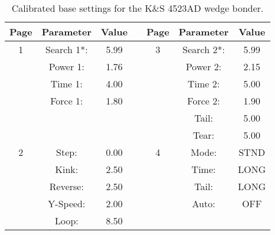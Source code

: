 \documentclass[../main.tex]{subfiles}
\begin{document}
%
    \Xtable%
    \begin{table}[ht]%
        \caption{Calibrated base settings for the K\&S 4523AD wedge bonder.}%
        \centering%
        \begin{tabu}{ c c c p{0.50in} c c c }%
            \toprule%
            \centering\textbf{Page} &%
            \centering\textbf{Parameter} &%
            \centering\textbf{Value}&%
            &%
            \centering\textbf{Page} &%
            \centering\textbf{Parameter} &%
            \centering\textbf{Value} \\%
            \toprule%
            1 & Search 1*: & 5.99 && 3 & Search 2*: & 5.99 \\%
            & Power 1: & 1.76 &&& Power 2: & 2.15 \\%
            & Time 1: & 4.00 &&& Time 2: & 5.00 \\%
            & Force 1: & 1.80 &&& Force 2: & 1.90 \\%
            &&&&& Tail: & 5.00 \\%
            &&&&& Tear: & 5.00 \\%
            2 & Step: & 0.00 && 4 & Mode: & STND \\%
            & Kink: & 2.50 &&& Time: & LONG \\%
            & Reverse: & 2.50 &&& Tail: & LONG \\%
            & Y-Speed: & 2.00 &&& Auto: & OFF \\%
            & Loop: & 8.50 \\%
            \bottomrule%
        \end{tabu}%
        \label{tbl:wire-bonder-settings}%
    \end{table}%
\end{document}

